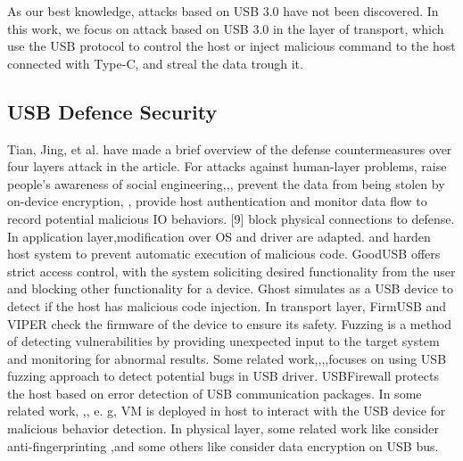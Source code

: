 As our best knowledge, attacks based on USB 3.0\cite{usb03} have not been discovered. In this work, we focus on attack based on USB 3.0 in the layer of transport\cite{sok}, which use the USB protocol to control the host or inject malicious command to the host connected with Type-C\cite{typec}, and streal the data trough it.

\subsection{USB Defence Security}

Tian, Jing, et al.\cite{sok} have made a brief overview of the defense countermeasures over four layers attack in the article. For attacks against human-layer problems, \cite{cmu}raise people's awareness of social engineering,\cite{Ironkey},\cite{Kanguru},\cite{diwan2014complete} prevent the data from being stolen by on-device encryption, \cite{butler2010kells},\cite{tian2016provusb} provide host authentication and monitor data flow to record potential malicious IO behaviors. [9] block physical connections to defense. In application layer,modification over OS and driver are adapted. \cite{pham2010optimizing} and \cite{OPSWAT} harden  host system to prevent automatic execution of malicious code. GoodUSB \cite{tian2015defending} offers strict access control, with the system soliciting desired functionality from the user and blocking other functionality for a device. Ghost \cite{poeplau2012honeypot} simulates as a USB device to detect if the host has malicious code injection. In transport layer, FirmUSB \cite{hernandez2017firmusb} and VIPER \cite{li2011viper} check the firmware of the device to ensure its safety. Fuzzing is a method of detecting vulnerabilities by providing unexpected input to the target system and monitoring for abnormal results. Some related work,\cite{jodeit2010usb},\cite{schumilo2014don},\cite{patrick2017potus},focuses on using USB fuzzing approach to detect potential bugs in USB driver. USBFirewall \cite{johnson2017protecting} protects the host based on error detection of USB communication packages. In some related work, \cite{tian2015defending},\cite{angel2016defending}, e. g, VM is deployed in host to interact with the USB device for malicious behavior detection. In physical layer, some related work like \cite{bates2014leveraging} consider anti-fingerprinting ,and some others like \cite{neugschwandtner2016transparent} consider data encryption on USB bus.